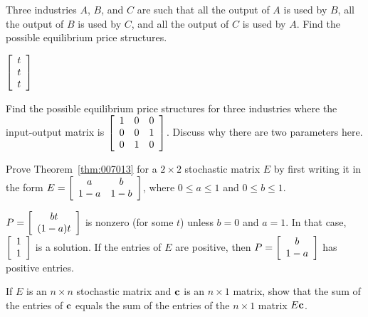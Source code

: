 \begin{multicols}{2}
\begin{ex}
Three industries $A$, $B$, and $C$ are such that all the output of $A$ is used by $B$, all the output of $B$ is used by $C$, and all the output of $C$ is used by $A$. Find the possible equilibrium price structures.

\begin{sol}
$\left[ \begin{array}{r}
t \\
t \\
t
\end{array} \right]$
\end{sol}
\end{ex}

\begin{ex}
Find the possible equilibrium price structures for three industries where the input-output matrix is $\left[ \begin{array}{rrr}
1 & 0 & 0 \\
0 & 0 & 1 \\
0 & 1 & 0
\end{array} \right]$. Discuss why there are two parameters here.
\end{ex}

\begin{ex}
Prove Theorem~\ref{thm:007013} for a $2 \times 2$ stochastic matrix $E$ by first writing it in the form $E = \left[ \begin{array}{cc}
a & b \\
1 - a & 1 - b
\end{array} \right]$, where $0 \leq a \leq 1$ and $0 \leq b \leq 1$.

\begin{sol}
$P = \left[ \begin{array}{c}
bt \\
(1 - a)t
\end{array} \right]$
 is nonzero (for some $t$) unless $b = 0$ and $a = 1$. In that case, $\left[ \begin{array}{r}
 1 \\
 1
 \end{array} \right]$
 is a solution. If the entries of $E$ are positive, then $P = \left[ \begin{array}{c}
 b \\
 1 - a
 \end{array} \right]$
 has positive entries.
\end{sol}
\end{ex}

\begin{ex}
If $E$ is an $n \times n$ stochastic matrix and $\textbf{c}$ is an $n \times 1$ matrix, show that the sum of the entries of $\textbf{c}$ equals the sum of the entries of the $n \times 1$ matrix $E\textbf{c}$.
\end{ex}


\end{multicols}
